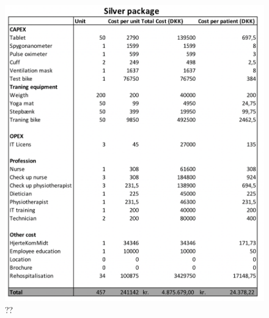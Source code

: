 \begin{figure}[H]
\centering
\includegraphics[width=1\textwidth]{Figure/Silver.png}
\caption{??}
\label{fig: Silver}
\end{figure} 

